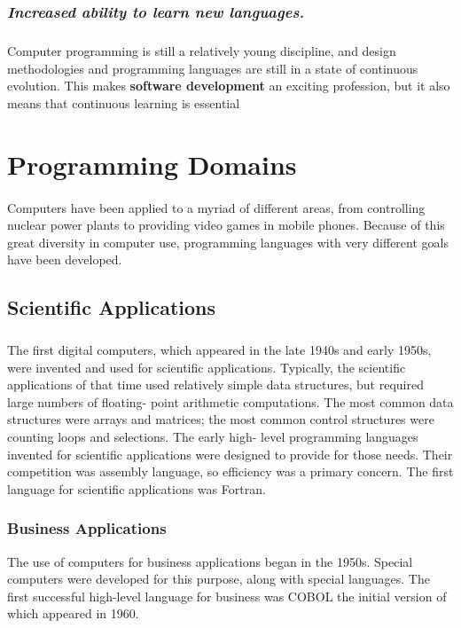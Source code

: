 \documentclass[12pt]{article}
\begin{document}
\subsubsection{\textit{Increased ability to learn new languages.}}
\subparagraph{}Computer programming is still a relatively young discipline, and design methodologies and programming languages are still in a state of continuous evolution. This makes \textbf {software development} an exciting profession, but it also 
means that continuous learning is essential
\section{Programming Domains}
\paragraph{} Computers have been applied to a myriad of different areas, from controlling 
nuclear power plants to providing video games in mobile phones. Because of 
this great diversity in computer use, programming languages with very different 
goals have been developed.
\subsection{ Scientific Applications}
\subparagraph{} The first digital computers, which appeared in the late 1940s and early 1950s, 
were invented and used for scientific applications. Typically, the scientific applications of that time used relatively simple data structures, but required large 
numbers of floating- point arithmetic computations. The most common data 
structures were arrays and matrices; the most common control structures were 
counting loops and selections. The early high- level programming languages 
invented for scientific applications were designed to provide for those needs. 
Their competition was assembly language, so efficiency was a primary concern. 
The first language for scientific applications was Fortran. 
\subsubsection{ Business Applications}
The use of computers for business applications began in the 1950s. Special 
computers were developed for this purpose, along with special languages. The 
first successful high-level language for business was COBOL the initial version of which appeared in 1960.
\newpage
{}
\end{document}
